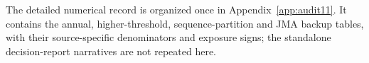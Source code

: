 The detailed numerical record is organized once in Appendix~\ref{app:audit11}. It contains the annual, higher-threshold, sequence-partition and JMA backup tables, with their source-specific denominators and exposure signs; the standalone decision-report narratives are not repeated here.








